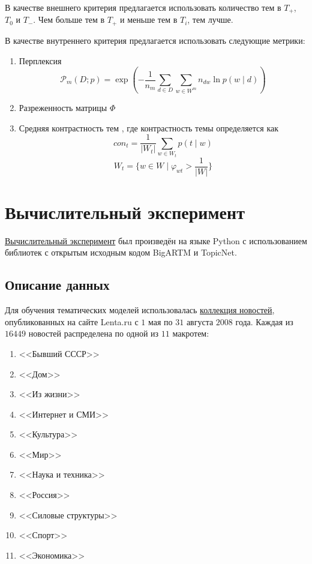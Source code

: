 \documentclass{article}
\begin{document}
В качестве внешнего критерия предлагается использовать количество тем в $T_+$, $T_0$ и $T_-$.
Чем больше тем в $T_+$ и меньше тем в $T_i$, тем лучше.

В качестве внутреннего критерия предлагается использовать следующие метрики:

\begin{enumerate}
    \item Перплексия \citep{bigartm}
    \begin{equation}
        \mathcal{P}_m (D; p) = \exp \left( - \frac{1}{n_m} \sum \limits_{d \in D} \sum \limits_{w \in W^m} n_{dw} \ln p (w \mid d) \right)
    \end{equation}
    \item Разреженность матрицы $\Phi$
    \item Средняя контрастность тем \citep{bigartm}, где контрастность темы определяется как
    \begin{equation}
        {con}_t = \frac{1}{|W_t|} \sum \limits_{w \in W_t} p(t \mid w)
    \end{equation}
    \begin{equation}
        W_t = \{ w \in W \mid \varphi_{wt} > \frac{1}{|W|} \}
    \end{equation}
\end{enumerate}

\section{Вычислительный эксперимент}

\href{https://github.com/intsystems/2023-Project-131/blob/master/code/Experiment_Tuning_Last.ipynb}{Вычислительный эксперимент} был произведён на языке Python с использованием библиотек с открытым исходным кодом BigARTM и TopicNet.

\subsection{Описание данных}

Для обучения тематических моделей использовалась \href{https://disk.yandex.ru/d/DAdhmVB2eFkdBQ}{коллекция новостей}, опубликованных на сайте Lenta.ru с $1$ мая по $31$ августа $2008$ года.
Каждая из $16449$ новостей распределена по одной из $11$ макротем:

\begin{enumerate}
    \item <<Бывший СССР>>
    \item <<Дом>>
    \item <<Из жизни>>
    \item <<Интернет и СМИ>>
    \item <<Культура>>
    \item <<Мир>>
    \item <<Наука и техника>>
    \item <<Россия>>
    \item <<Силовые структуры>>
    \item <<Спорт>>
    \item <<Экономика>> 
\end{enumerate}
\end{document}

